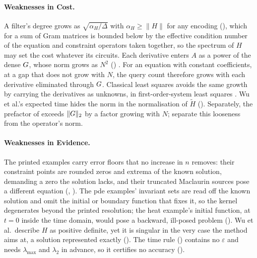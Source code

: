 \paragraph{Weaknesses in Cost.} A filter's degree grows as $\sqrt{\alpha_H/\Delta}$ with $\alpha_H\ge\|H\|$ for any encoding (), which for a sum of Gram matrices is bounded below by the effective condition number of the equation and constraint operators taken together, so the spectrum of $H$ may set the cost whatever its circuits. Each derivative enters $A$ as a power of the dense $G$, whose norm grows as $N^2$ () \cite{olver2013}. For an equation with constant coefficients, at a gap that does not grow with $N$, the query count therefore grows with each derivative eliminated through $G$. Classical least squares avoids the same growth by carrying the derivatives as unknowns, in first-order-system least squares \cite{cai1994fosls}. Wu et al.'s expected time hides the norm in the normalisation of $\tilde H$ (). Separately, the prefactor of  exceeds $\|G\|_2$ by a factor growing with $N$;  separate this looseness from the operator's norm.

\paragraph{Weaknesses in Evidence.} The printed examples carry error floors that no increase in $n$ removes: their constraint points are rounded zeros and extrema of the known solution, demanding a zero the solution lacks, and their truncated Maclaurin sources pose a different equation (, ). The \gls{pde} examples' invariant sets are read off the known solution and omit the initial or boundary function that fixes it, so the kernel degenerates beyond the printed resolution; the heat example's initial function, at $t=0$ inside the time domain, would pose a backward, ill-posed problem (). Wu et al.\ describe $H$ as positive definite, yet it is singular in the very case the method aims at, a solution represented exactly (). The time rule () contains no $\varepsilon$ and needs $\lambda_{\max}$ and $\lambda_2$ in advance, so it certifies no accuracy ().

